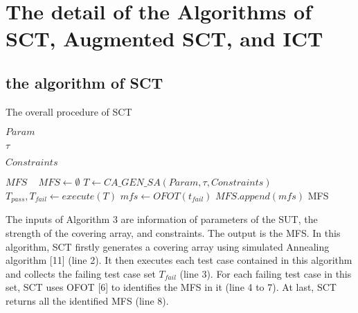 \documentclass[10pt,journal,compsoc]{IEEEtran}
\begin{document}
\appendices
\section{The detail of the Algorithms of SCT, Augmented SCT, and ICT}

\subsection{the algorithm of SCT}
\begin{algorithm}
  \caption{The overall procedure of SCT}
  \begin{algorithmic}[1]
     \Require


     $Param$ 

     $\tau$ 

     $Constraints$  





\Ensure  $MFS$ 
\
       \State $MFS \leftarrow \emptyset$
       \State $T \leftarrow CA\_GEN\_SA(Param, \tau, Constraints)$
       \State $T_{pass}, T_{fail}\leftarrow execute(T)$
         \State  $mfs \leftarrow OFOT(t_{fail}) $
         \State $MFS.append(mfs) $
       \EndFor
    \State \Return   MFS
  \end{algorithmic}
\end{algorithm}

The inputs of Algorithm 3 are information of parameters of the SUT, the strength of the covering array, and constraints. The output is the MFS. In this algorithm, SCT firstly generates a covering array using simulated Annealing algorithm [11] (line 2). It then executes each test case contained in this algorithm and collects the failing test case set $T_{fail}$ (line 3).  For each failing test case in this set, SCT uses OFOT [6] to identifies the MFS in it (line 4 to 7). At last, SCT returns all the identified MFS (line 8).
\end{document}
